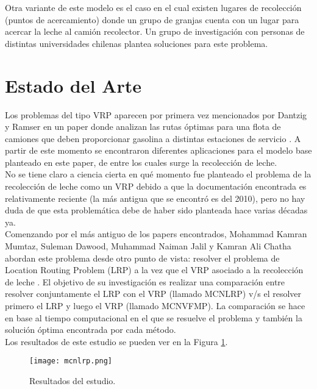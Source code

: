 \documentclass[letter, 10pt]{article}
\begin{document}
Otra variante de este modelo es el caso en el cual existen lugares de recolecci\'on (puntos de acercamiento) donde un grupo de granjas cuenta con un lugar para acercar la leche al cami\'on recolector. Un grupo de investigaci\'on con personas de distintas universidades chilenas plantea soluciones para este problema\cite{puntos}. 

\section{Estado del Arte}

Los problemas del tipo VRP aparecen por primera vez mencionados por Dantzig y Ramser en un paper donde analizan las rutas \'optimas para una flota de camiones que deben proporcionar gasolina a distintas estaciones de servicio \cite{VRP}. A partir de este momento se encontraron diferentes aplicaciones para el modelo base planteado en este paper, de entre los cuales surge la recolecci\'on de leche. \\

No se tiene claro a ciencia cierta en qu\'e momento fue planteado el problema de la recolecci\'on de leche como un VRP debido a que la documentaci\'on encontrada es relativamente reciente (la m\'as antigua que se encontr\'o es del 2010), pero no hay duda de que esta problem\'atica debe de haber sido planteada hace varias d\'ecadas ya. \\

Comenzando por el m\'as antiguo de los papers encontrados, Mohammad Kamran Mumtaz, Suleman Dawood, Muhammad Naiman Jalil y Kamran Ali Chatha abordan este problema desde otro punto de vista: resolver el problema de Location Routing Problem (LRP) a la vez que el VRP asociado a la recolecci\'on de leche \cite{LRP}. El objetivo de su investigaci\'on es realizar una comparaci\'on entre resolver conjuntamente el LRP con el VRP (llamado MCNLRP) v/s el resolver primero el LRP y luego el VRP (llamado MCNVFMP). La comparaci\'on se hace en base al tiempo computacional en el que se resuelve el problema y tambi\'en la soluci\'on \'optima encontrada por cada m\'etodo. \\

Los resultados de este estudio se pueden ver en la Figura \ref{tabla1}.\\

\begin{figure}[H]
\centering
\texttt{[image: mcnlrp.png]}
\caption{Resultados del estudio.}
\label{tabla1}
\end{figure} \\
\end{document}
